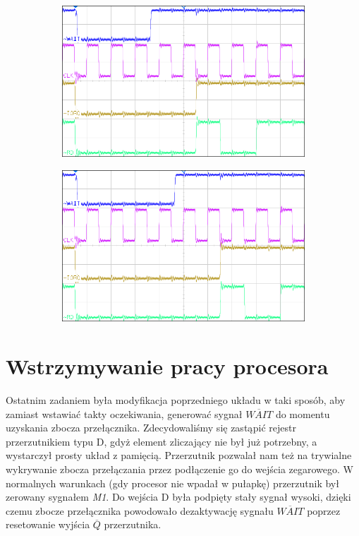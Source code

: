 \documentclass[fleqn]{article}
\begin{document}
\begin{figure}[H]
\begin{subfigure}[b]{0.49\textwidth}
		\caption{}
	\end{subfigure}
	\begin{subfigure}[b]{0.49\textwidth}
		\includegraphics[width=\textwidth]{img/2d.png}
		\caption{}
	\end{subfigure}
	\begin{subfigure}[b]{0.49\textwidth}
		\includegraphics[width=\textwidth]{img/2e.png}
		\caption{}
	\end{subfigure}
	\caption{}
\end{figure}

\section{Wstrzymywanie pracy procesora}

Ostatnim zadaniem była modyfikacja poprzedniego układu w taki sposób, aby zamiast wstawiać takty oczekiwania, generować sygnał $\overline{WAIT}$ do momentu uzyskania zbocza przełącznika.
Zdecydowaliśmy się zastąpić rejestr przerzutnikiem typu D, gdyż element zliczający nie był już potrzebny, a wystarczył prosty układ z pamięcią. Przerzutnik pozwalał nam też na trywialne wykrywanie zbocza przełączania przez podłączenie go do wejścia zegarowego.
W normalnych warunkach (gdy procesor nie wpadał w pułapkę) przerzutnik był zerowany sygnałem \textit{M1}. Do wejścia D była podpięty stały sygnał wysoki, dzięki czemu zbocze przełącznika powodowało dezaktywację sygnału $\overline{WAIT}$ poprzez resetowanie wyjścia $\overline{Q}$ przerzutnika.
\end{document}
